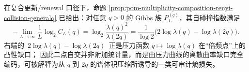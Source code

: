 \begin{remark}\label{rem:pom-two-point-collision-as-volume-gap}
在复合更新/renewal 口径下，命题 \ref{prop:pom-multiplicity-composition-renyi-collision-generalq} 已给出：对任意 \(q>0\) 的 Gibbs 族 \(P_L^{(q)}\)，其自碰撞指数满足
\[
-\lim_{L\to\infty}\frac{1}{L}\log_2 C_L(q)=\log_2\frac{\lambda(q)^2}{\lambda(2q)}
=\frac{1}{\log 2}\bigl(2\log\lambda(q)-\log\lambda(2q)\bigr).
\]
右端的 \(\,2\log\lambda(q)-\log\lambda(2q)\,\) 正是压力函数 \(q\mapsto\log\lambda(q)\) 在“倍频点”上的凸性缺口；
因此二点自交并非附加统计量，而是由压力曲线的离散曲率缺口完全编码，可被解释为从 \(q\) 到 \(2q\) 的谱体积压缩所诱导的一类可审计熵损失。
\end{remark}

